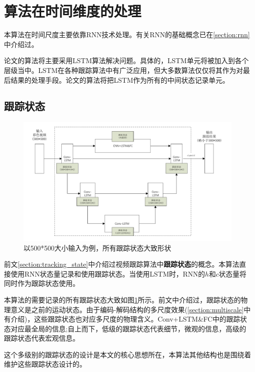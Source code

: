\section{算法在时间维度的处理}
\par
本算法在时间尺度主要依靠RNN技术处理。有关RNN的基础概念已在\ref{section:rnn}中介绍过。
\par
论文的算法将主要采用LSTM算法解决问题。具体的，LSTM单元将被加入到各个层级当中。LSTM在各种跟踪算法中有广泛应用，但大多数算法仅仅将其作为对最后结果的处理手段。论文的算法将把LSTM作为所有的中间状态记录单元。

\subsection{跟踪状态}
\par
\begin{figure}
    \centering
    \includegraphics[width = 1.\textwidth]{chap/img/tracking_state.pdf}
    \caption{以500*500大小输入为例，所有跟踪状态大致形状}
    \label{fig:tracking_state}
\end{figure}
\par
前文\ref{section:tracking_state}中介绍过视频跟踪算法中\textbf{跟踪状态}的概念。本算法直接使用RNN状态量记录和使用跟踪状态。当使用LSTM时，RNN的$h$和$c$状态量将同时作为跟踪状态使用。
\par
本算法的需要记录的所有跟踪状态大致如图\ref{fig:tracking_state}所示。前文中介绍过，跟踪状态的物理意义是之前的运动状态。由于编码-解码结构的多尺度效果(\ref{section:multiscale}中有介绍)，这些跟踪状态也对应多尺度的物理含义。Conv+LSTM\&FC中的跟踪状态对应最全局的信息;自上而下，低级的跟踪状态代表细节，微观的信息，高级的跟踪状态代表宏观信息。
\par
这个多级别的跟踪状态的设计是本文的核心思想所在，本算法其他结构也是围绕着维护这些跟踪状态设计的。

